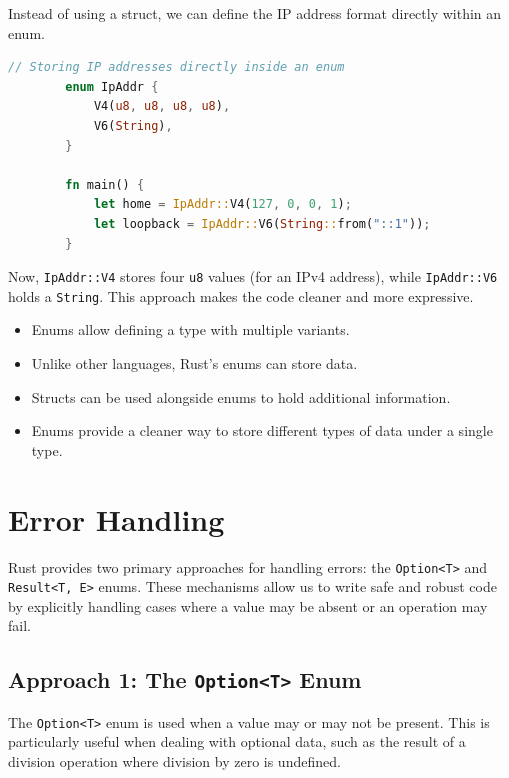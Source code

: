 \documentclass[a4paper,12pt]{report}
\begin{document}
	Instead of using a struct, we can define the IP address format directly within an enum.
	
	\begin{lstlisting}[language=Rust]
		// Storing IP addresses directly inside an enum
		enum IpAddr {
			V4(u8, u8, u8, u8),
			V6(String),
		}
		
		fn main() {
			let home = IpAddr::V4(127, 0, 0, 1);
			let loopback = IpAddr::V6(String::from("::1"));
		}
	\end{lstlisting}
	
	\noindent Now, \texttt{IpAddr::V4} stores four \texttt{u8} values (for an IPv4 address), while \texttt{IpAddr::V6} holds a \texttt{String}. This approach makes the code cleaner and more expressive.
	
	\begin{takeawaybox}
		
		\begin{itemize}
			\item Enums allow defining a type with multiple variants.
			\item Unlike other languages, Rust's enums can store data.
			\item Structs can be used alongside enums to hold additional information.
			\item Enums provide a cleaner way to store different types of data under a single type.
		\end{itemize}
	\end{takeawaybox}
	
	
	
	\section{Error Handling}
	
	Rust provides two primary approaches for handling errors: the \texttt{Option<T>} and \texttt{Result<T, E>} enums. These mechanisms allow us to write safe and robust code by explicitly handling cases where a value may be absent or an operation may fail.
	
	\subsection*{Approach 1: The \texttt{Option<T>} Enum}
	
	The \texttt{Option<T>} enum is used when a value may or may not be present. This is particularly useful when dealing with optional data, such as the result of a division operation where division by zero is undefined.
	
\end{document}
